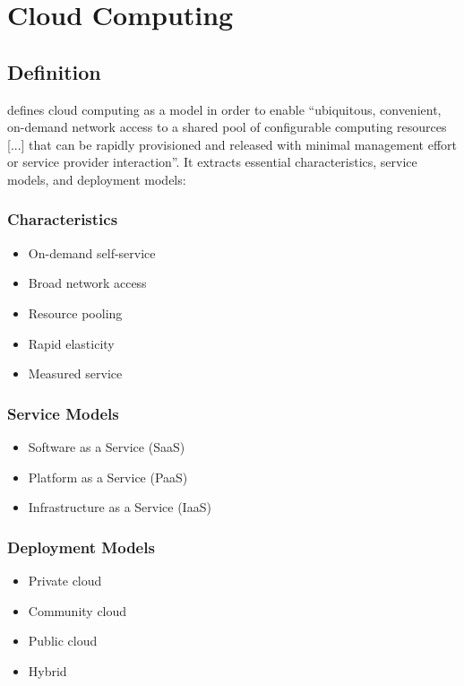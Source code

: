 \section{Cloud Computing}
\label{sec:cloud-computing}

\subsection{Definition}

 \cite{mell2011} defines cloud computing as a model in order
to enable ``ubiquitous, convenient, on-demand network access to a shared pool of
configurable computing resources [...] that can be rapidly provisioned and
released with minimal management effort or service provider interaction''. It
extracts essential characteristics, service models, and deployment models:

\subsubsection{Characteristics}

\begin{itemize}
  \item On-demand self-service
  \item Broad network access
  \item Resource pooling
  \item Rapid elasticity
  \item Measured service
\end{itemize}

\subsubsection{Service Models}

\begin{itemize}
  \item Software as a Service (SaaS)
  \item Platform as a Service (PaaS)
  \item Infrastructure as a Service (IaaS)
\end{itemize}

\subsubsection{Deployment Models}

\begin{itemize}
  \item Private cloud
  \item Community cloud
  \item Public cloud
  \item Hybrid
\end{itemize}
